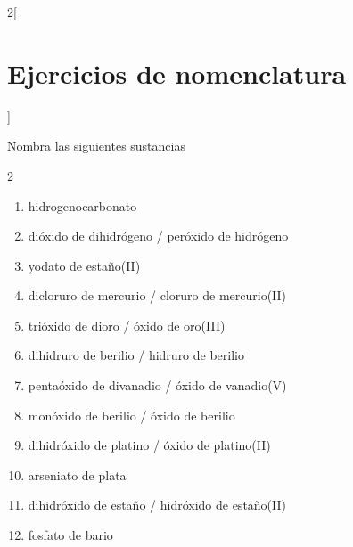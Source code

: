 \documentclass[10pt]{article}
\begin{document}
\begin{multicols*}{2}[
  \section{Ejercicios de nomenclatura}
  ]
\begin{exercise}[
    tags    = {inorgánica,nomenclatura,múltiple,2B},
    topics  = {química inorgánica,formulación,nomenclatura},
    source  = {Química 2B SAN 2016, p372, e9},
  ]
  Nombra las siguientes sustancias

  \begin{enumerate}\begin{multicols}{2}
    \item {}
    \item {}
    \item {}
    \item {}
    \item {}
    \item {}
    \item {}
    \item {}
    \item {}
    \item {}
    \item {}
    \item {}
  \end{multicols}\end{enumerate}
\end{exercise}

\begin{solution}
  \begin{enumerate}
    \item hidrogenocarbonato
    \item dióxido de dihidrógeno / peróxido de hidrógeno
    \item yodato de estaño(II)
    \item dicloruro de mercurio / cloruro de mercurio(II)
    \item trióxido de dioro / óxido de oro(III)
    \item dihidruro de berilio / hidruro de berilio
    \item pentaóxido de divanadio / óxido de vanadio(V)
    \item monóxido de berilio / óxido de berilio
    \item dihidróxido de platino / óxido de platino(II)
    \item arseniato de plata
    \item dihidróxido de estaño / hidróxido de estaño(II)
    \item fosfato de bario
  \end{enumerate}
\end{solution}





\end{multicols*}
\end{document}
